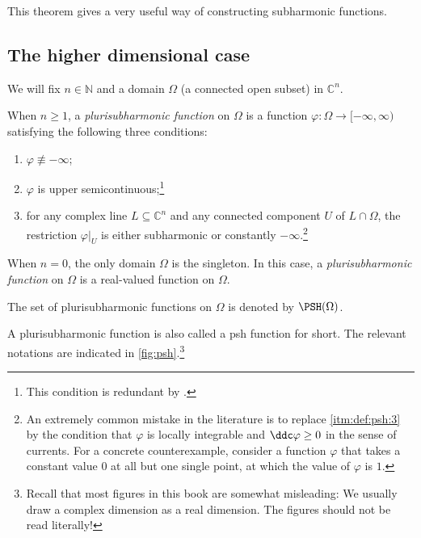 This theorem gives a very useful way of constructing subharmonic functions.

\subsection{The higher dimensional case}
\label{subsec:psh_hd}
We will fix $n\in \mathbb{N}$ and a domain $\Omega$ (a connected open subset) in $\mathbb{C}^n$.

\begin{definition}\label{def:psh}
    When $n\geq 1$, a \emph{plurisubharmonic function} on $\Omega$ is a function $\varphi\colon \Omega\rightarrow [-\infty,\infty)$ satisfying the following three conditions:
    \begin{enumerate}
        \item\label{itm:def:psh:1} $\varphi\not\equiv -\infty$;
        \item\label{itm:def:psh:2} $\varphi$ is upper semicontinuous;\footnote{This condition is redundant by \cite[Theorem~8.1.3]{FPT}.}
        \item\label{itm:def:psh:3} for any complex line $L\subseteq \mathbb{C}^n$ and any connected component $U$ of $L\cap \Omega$, the restriction $\varphi|_U$ is either subharmonic or constantly $-\infty$.\footnote{An extremely common mistake in the literature is to replace \ref{itm:def:psh:3} by the condition that $\varphi$ is locally integrable and $\ddc\varphi\geq 0$ in the sense of currents. For a concrete counterexample, consider a function $\varphi$ that takes a constant value $0$ at all but one single point, at which the value of $\varphi$ is $1$.}
    \end{enumerate}

    When $n=0$, the only domain $\Omega$ is the singleton. In this case, a \emph{plurisubharmonic function} on $\Omega$ is a real-valued function on $\Omega$.

    The set of plurisubharmonic functions on $\Omega$ is denoted by $\PSH(\Omega)$\index{$\PSH(\Omega)$}.
\end{definition}
A plurisubharmonic function is also called a psh function for short. The relevant notations are indicated in \cref{fig:psh}.\footnote{Recall that most figures in this book are somewhat misleading: We usually draw a complex dimension as a real dimension. The figures should not be read literally!}


